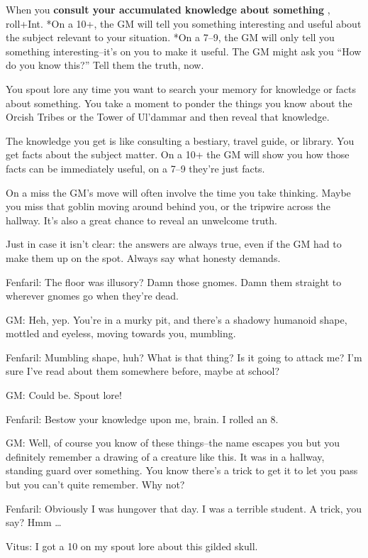  When you \textbf{consult your accumulated knowledge about something}
, roll+Int. *On a 10+, the GM will tell you something interesting and useful about the subject relevant to your situation. *On a 7--9, the GM will only tell you something interesting--it's on you to make it useful. The GM might ask you ``How do you know this?'' Tell them the truth, now.


 You spout lore any time you want to search your memory for knowledge or facts about something. You take a moment to ponder the things you know about the Orcish Tribes or the Tower of Ul'dammar and then reveal that knowledge.


 The knowledge you get is like consulting a bestiary, travel guide, or library. You get facts about the subject matter. On a 10+ the GM will show you how those facts can be immediately useful, on a 7--9 they're just facts.


 On a miss the GM's move will often involve the time you take thinking. Maybe you miss that goblin moving around behind you, or the tripwire across the hallway. It's also a great chance to reveal an unwelcome truth.


 Just in case it isn't clear: the answers are always true, even if the GM had to make them up on the spot. Always say what honesty demands.


 Fenfaril: The floor was illusory? Damn those gnomes. Damn them straight to wherever gnomes go when they're dead.


 GM: Heh, yep. You're in a murky pit, and there's a shadowy humanoid shape, mottled and eyeless, moving towards you, mumbling.


 Fenfaril: Mumbling shape, huh? What is that thing? Is it going to attack me? I'm sure I've read about them somewhere before, maybe at school?


 GM: Could be. Spout lore!


 Fenfaril: Bestow your knowledge upon me, brain. I rolled an 8.


 GM: Well, of course you know of these things--the name escapes you but you definitely remember a drawing of a creature like this. It was in a hallway, standing guard over something. You know there's a trick to get it to let you pass but you can't quite remember. Why not?


 Fenfaril: Obviously I was hungover that day. I was a terrible student. A trick, you say? Hmm \ldots 


 Vitus: I got a 10 on my spout lore about this gilded skull.


